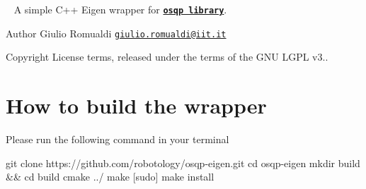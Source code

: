 ~\newline
 A simple C++ Eigen wrapper for \href{https://osqp.org/}{\tt {\bfseries osqp library}}. \begin{DoxyAuthor}{Author}
Giulio Romualdi \href{mailto:giulio.romualdi@iit.it}{\tt giulio.\+romualdi@iit.\+it} ~\newline
 
\end{DoxyAuthor}
\begin{DoxyCopyright}{Copyright}
License terms, released under the terms of the G\+NU L\+G\+PL v3..
\end{DoxyCopyright}
\hypertarget{index_build-section}{}\section{How to build the wrapper}\label{index_build-section}
Please run the following command in your terminal 
\begin{DoxyCode}
git clone https://github.com/robotology/osqp-eigen.git
cd osqp-eigen
mkdir build && cd build
cmake ../
make
[sudo] make install
\end{DoxyCode}


